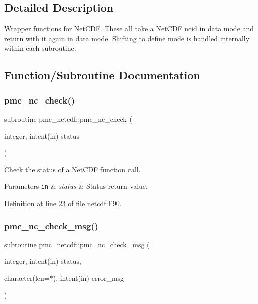 \subsection{Detailed Description}
Wrapper functions for Net\+C\+DF. These all take a Net\+C\+DF {\ttfamily ncid} in data mode and return with it again in data mode. Shifting to define mode is handled internally within each subroutine. 

\subsection{Function/\+Subroutine Documentation}
\mbox{\label{namespacepmc__netcdf_aeb26885b57dbc718ca9d8a8d4cc1660b}} 
\subsubsection{\texorpdfstring{pmc\+\_\+nc\+\_\+check()}{pmc\_nc\_check()}}
{\footnotesize\ttfamily subroutine pmc\+\_\+netcdf\+::pmc\+\_\+nc\+\_\+check (\begin{DoxyParamCaption}\item[{integer, intent(in)}]{status }\end{DoxyParamCaption})}



Check the status of a Net\+C\+DF function call. 


\begin{DoxyParams}[1]{Parameters}
\mbox{\tt in}  & {\em status} & Status return value. \\
\hline
\end{DoxyParams}


Definition at line 23 of file netcdf.\+F90.

\mbox{\label{namespacepmc__netcdf_a44641c8551b43500185faf232a8b743f}} 
\subsubsection{\texorpdfstring{pmc\+\_\+nc\+\_\+check\+\_\+msg()}{pmc\_nc\_check\_msg()}}
{\footnotesize\ttfamily subroutine pmc\+\_\+netcdf\+::pmc\+\_\+nc\+\_\+check\+\_\+msg (\begin{DoxyParamCaption}\item[{integer, intent(in)}]{status,  }\item[{character(len=$\ast$), intent(in)}]{error\+\_\+msg }\end{DoxyParamCaption})}



